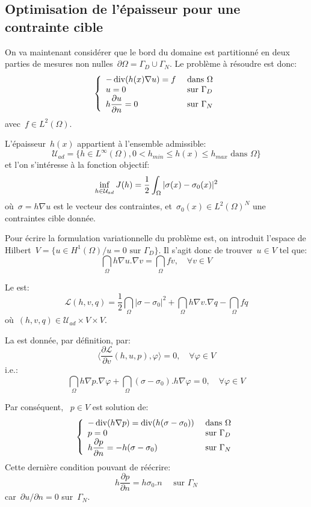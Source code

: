 \subsection{Optimisation de l'épaisseur pour une contrainte cible}

On va maintenant considérer que le bord du domaine est partitionné en deux parties de mesures non nulles~$\partial\Omega=\Gamma_D\cup\Gamma_N$. Le problème à résoudre est donc:
\[\left\{\begin{array}{ll} -\operatorname{div} (h(x)\nabla u)=f &\text{ dans }\Omega\\ 
u=0 &\text{ sur }\Gamma_D\\ h\dfrac{\partial u}{\partial n} =0 &\text{ sur }\Gamma_N \end{array} \right. \]
avec~$f\in L^2(\Omega)$.

L'épaisseur~$h(x)$ appartient à l'ensemble admissible:
\[ \mathcal{U}_{ad} = \{ h\in L^\infty(\Omega), 0< h_{min}\le h(x)\le h_{max} \text{ dans }\Omega \} \]
et l'on s'intéresse à la fonction objectif:
\[\colorblue \inf_{h\in\mathcal{U}_{ad}} J(h) = \dfrac12\dint_\Omega |\sigma(x)-\sigma_0(x)|^2 \]
où~$\sigma=h\nabla u$ est le vecteur des contraintes, et~$\sigma_0(x)\in L^2(\Omega)^N$  une contraintes cible donnée.

\medskip
Pour écrire la formulation variationnelle du problème est, on introduit l'espace de Hilbert~$V=\{u\in H^1(\Omega)/ u=0 \text{ sur }\Gamma_D\}$. Il s'agit donc de trouver~$u\in V$ tel que:
\[ \dint_\Omega h\nabla u.\nabla v=\dint_\Omega fv, \quad \forall v\in V \]

Le  est:
\[ \mathcal{L}(h,v,q) = \frac12\dint_\Omega |\sigma-\sigma_0|^2 + \dint_\Omega h\nabla v.\nabla q - \dint_\Omega fq \]
où~$(h,v,q)\in \mathcal{U}_{ad}\times V\times V$.

\medskip
La  est donnée, par définition, par:
\[ \langle \dfrac{\partial \mathcal{L}}{\partial v}(h,u,p),\varphi\rangle=0, \quad \forall\varphi\in V \]
i.e.:
\[ \dint_\Omega h\nabla p.\nabla\varphi + \dint_\Omega (\sigma-\sigma_0).h\nabla\varphi =0, \quad \forall\varphi\in V \]

Par conséquent, ~$p\in V$ est solution de:
\[\left\{\begin{array}{ll}
-\operatorname{div}(h\nabla p) = \operatorname{div}(h(\sigma-\sigma_0)) &\text{ dans }\Omega\\
p=0 &\text{ sur }\Gamma_D\\
h\dfrac{\partial p}{\partial n}=-h(\sigma-\sigma_0) &\text{ sur }\Gamma_N
\end{array}\right.\]
Cette dernière condition pouvant de réécrire:
\[ h\dfrac{\partial p}{\partial n}=h\sigma_0.n \quad\text{ sur }\Gamma_N \]
car~$\partial u/\partial n=0$ sur~$\Gamma_N$.

